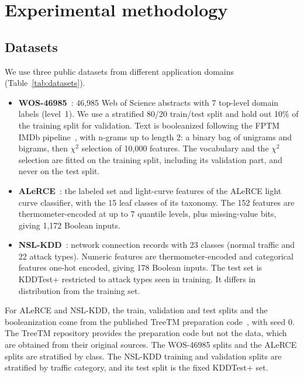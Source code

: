 \section{Experimental methodology}\label{sec:method}

\subsection{Datasets}
We use three public datasets from different application domains (Table~\ref{tab:datasets}).
\begin{itemize}
\item \textbf{WOS-46985}~\cite{kowsari2017hdltex}: 46,985 Web of Science abstracts with 7 top-level domain labels (level~1).
We use a stratified 80/20 train/test split and hold out 10\% of the training split for validation.
Text is booleanized following the FPTM IMDb pipeline~\cite{hnilov2025code}, with n-grams up to length 2: a binary bag of unigrams and bigrams, then $\chi^2$ selection of 10,000 features.
The vocabulary and the $\chi^2$ selection are fitted on the training split, including its validation part, and never on the test split.
\item \textbf{ALeRCE}~\cite{sanchezsaez2021alerce}: the labeled set and light-curve features of the ALeRCE light curve classifier, with the 15 leaf classes of its taxonomy. The 152 features are thermometer-encoded at up to 7 quantile levels, plus missing-value bits, giving 1,172 Boolean inputs.
\item \textbf{NSL-KDD}~\cite{tavallaee2009nslkdd}: network connection records with 23 classes (normal traffic and 22 attack types). Numeric features are thermometer-encoded and categorical features one-hot encoded, giving 178 Boolean inputs. The test set is KDDTest+ restricted to attack types seen in training. It differs in distribution from the training set.
\end{itemize}
For ALeRCE and NSL-KDD, the train, validation and test splits and the booleanization come from the published TreeTM preparation code~\cite{treetm2026repo}, with seed 0. The TreeTM repository provides the preparation code but not the data, which are obtained from their original sources.
The WOS-46985 splits and the ALeRCE splits are stratified by class. The NSL-KDD training and validation splits are stratified by traffic category, and its test split is the fixed KDDTest+ set.

\begin{table}[!htbp]
\small
\centering
\caption{Datasets after booleanization.}
\label{tab:datasets}

\end{table}

